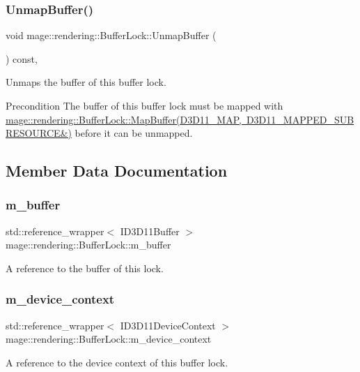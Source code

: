 \subsubsection{\texorpdfstring{Unmap\+Buffer()}{UnmapBuffer()}}
{\footnotesize\ttfamily void mage\+::rendering\+::\+Buffer\+Lock\+::\+Unmap\+Buffer (\begin{DoxyParamCaption}{ }\end{DoxyParamCaption}) const\hspace{0.3cm}{\ttfamily [private]}, {\ttfamily [noexcept]}}

Unmaps the buffer of this buffer lock.

\begin{DoxyPrecond}{Precondition}
The buffer of this buffer lock must be mapped with \mbox{\hyperlink{classmage_1_1rendering_1_1_buffer_lock_a88693ae3717c7098d5cc2313cd16b8a6}{mage\+::rendering\+::\+Buffer\+Lock\+::\+Map\+Buffer(\+D3\+D11\+\_\+\+M\+A\+P, D3\+D11\+\_\+\+M\+A\+P\+P\+E\+D\+\_\+\+S\+U\+B\+R\+E\+S\+O\+U\+R\+C\+E\&)}} before it can be unmapped. 
\end{DoxyPrecond}


\subsection{Member Data Documentation}
\mbox{\label{classmage_1_1rendering_1_1_buffer_lock_ae3e40fcda48227f62eb63611cad1a507}} 
\subsubsection{\texorpdfstring{m\+\_\+buffer}{m\_buffer}}
{\footnotesize\ttfamily std\+::reference\+\_\+wrapper$<$ I\+D3\+D11\+Buffer $>$ mage\+::rendering\+::\+Buffer\+Lock\+::m\+\_\+buffer\hspace{0.3cm}{\ttfamily [private]}}

A reference to the buffer of this lock. \mbox{\label{classmage_1_1rendering_1_1_buffer_lock_afa41d2028ffcffd11f7e17ae505d1e93}} 
\subsubsection{\texorpdfstring{m\+\_\+device\+\_\+context}{m\_device\_context}}
{\footnotesize\ttfamily std\+::reference\+\_\+wrapper$<$ I\+D3\+D11\+Device\+Context $>$ mage\+::rendering\+::\+Buffer\+Lock\+::m\+\_\+device\+\_\+context\hspace{0.3cm}{\ttfamily [private]}}

A reference to the device context of this buffer lock. 